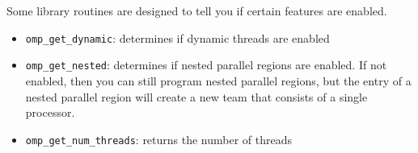 \documentclass[10pt]{article}
\begin{document}
\begin{flushleft}
Some library routines are designed to tell you if certain features are enabled.

\begin{itemize}
\item {\tt omp\_get\_dynamic}: determines if dynamic threads are enabled
\item {\tt omp\_get\_nested}: determines if nested parallel regions are enabled. If not enabled, then you can still program nested parallel regions, but the entry of a nested parallel region will create a new team that consists of a single processor.
\item {\tt omp\_get\_num\_threads}: returns the number of threads
\end{itemize}

\end{flushleft}
\end{document}
